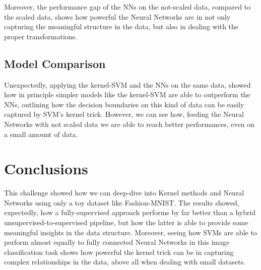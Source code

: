 \documentclass[a4paper, 10pt]{article}
\begin{document}
Moreover, the performance gap of the NNs on the not-scaled data, compared to the scaled data, shows how powerful the Neural Networks are in not only capturing
the meaningful structure in the data, but also in dealing with the proper transformations.

\subsection{Model Comparison}
Unexpectedly, applying the kernel-SVM and the NNs on the same data, showed how in principle simpler models like the kernel-SVM are able to outperform the NNs,
outlining how the decision boundaries on this kind of data can be easily captured by SVM's kernel trick. However, we can see how, feeding the Neural Networks 
with not scaled data we are able to reach better performances, even on a small amount of data.

\section{Conclusions}
This challenge showed how we can deep-dive into Kernel methods and Neural Networks using only a toy dataset like Fashion-MNIST. The results showed, expectedly,
how a fully-supervised approach performs by far better than a hybrid unsupervised-to-supervised pipeline, but how the latter is able to provide some meaningful 
insights in the data structure. Moreover, seeing how SVMs are able to perform almost equally to fully connected Neural Networks in this image classification task
shows how powerful the kernel trick can be in capturing complex relationships in the data, above all when dealing with small datasets.
\end{document}
